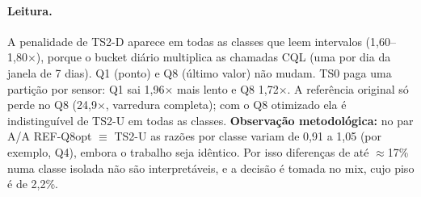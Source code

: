 \paragraph{Leitura.} A penalidade de TS2-D aparece em todas as classes que leem intervalos (1,60--1,80$\times$), porque o bucket diário multiplica as chamadas CQL (uma por dia da janela de 7 dias). Q1 (ponto) e Q8 (último valor) não mudam. TS0 paga uma partição por sensor: Q1 sai 1,96$\times$ mais lento e Q8 1,72$\times$. A referência original só perde no Q8 (24,9$\times$, varredura completa); com o Q8 otimizado ela é indistinguível de TS2-U em todas as classes. \textbf{Observação metodológica:} no par A/A REF-Q8opt $\equiv$ TS2-U as razões por classe variam de 0,91 a 1,05 (por exemplo, Q4), embora o trabalho seja idêntico. Por isso diferenças de até $\approx$17\% numa classe isolada não são interpretáveis, e a decisão é tomada no mix, cujo piso é de 2,2\%.
